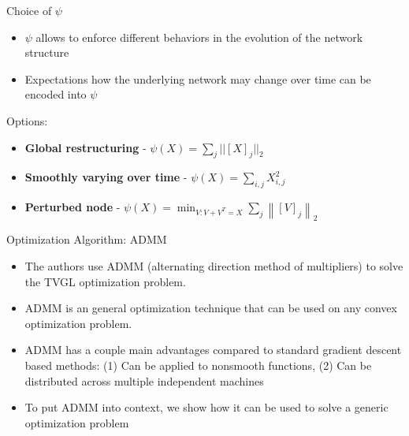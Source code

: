 \documentclass{beamer}
\begin{document}
\begin{frame}{Choice of $\psi$}
    \begin{itemize}
        \item $\psi$ allows to enforce different behaviors in the evolution of the network structure
        \item Expectations how the underlying network may change over time can be encoded into $\psi$
    \end{itemize}
    Options:
    \begin{itemize}
        \item \textbf{Global restructuring} - $\psi(X) = \sum_j||[X]_j||_2$
        \item \textbf{Smoothly varying over time} - $\psi(X) = \sum_{i,j}X^2_{i,j}$
        \item \textbf{Perturbed node} - $\psi(X)=\min _{V: V+V^{T}=X} \sum_{j}\left\|[V]_{j}\right\|_{2}$
    \end{itemize}
\end{frame}

\begin{frame}{Optimization Algorithm: ADMM}
	\begin{itemize}
		\item The authors use ADMM (alternating direction method of multipliers) to solve the TVGL optimization problem.
		\item ADMM is an general optimization technique that can be used on any convex optimization problem. 
		\item ADMM has a couple main advantages compared to standard gradient descent based methods: (1) Can be applied to nonsmooth functions, (2) Can be distributed across multiple independent machines
		\item To put ADMM into context, we show how it can be used to solve a generic optimization problem
	\end{itemize}
\end{frame}
\end{document}
